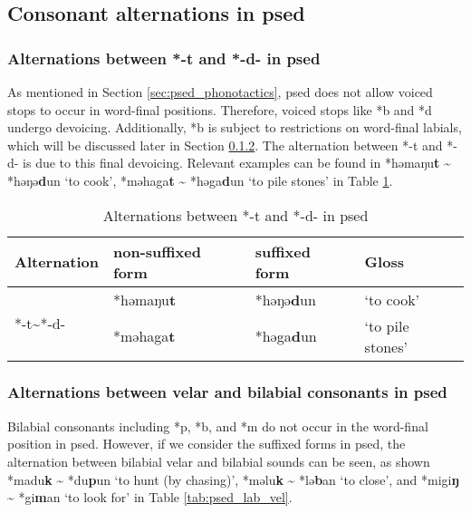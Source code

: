 \subsection{Consonant alternations in \acl{psed}}

\subsubsection{Alternations between *-t and *-d- in \acl{psed}}  \label{sec:psed_d2t}

As mentioned in Section \ref{sec:psed_phonotactics}, \acl{psed} does not allow voiced stops to occur in word-final positions. Therefore, voiced stops like *b and *d undergo devoicing. Additionally, *b is subject to restrictions on word-final labials, which will be discussed later in Section \ref{sed:psed_lab_vel}. The alternation between *-t and *-d- is due to this final devoicing. Relevant examples can be found in *həmaŋu\textbf{t} \~{} *həŋə\textbf{d}un `to cook', *məhaga\textbf{t} \~{} *həga\textbf{d}un `to pile stones' in Table \ref{tab:psed_d2t}.

\begin{table}[!htbp]
\centering
\caption{Alternations between *-t and *-d- in \acl{psed}}
\label{tab:psed_d2t}
\begin{tabular}{llll}
\hline
Alternation                   & non-suffixed form    & suffixed form & Gloss     \\ \hline
\multirow{2}{*}{*-t\~{ }*-d-} & *həmaŋu\textbf{t} & *həŋə\textbf{d}un     & `to cook' \\
                              & *məhaga\textbf{t} & *həga\textbf{d}un     & `to pile stones'   \\ \hline
\end{tabular}
\end{table}

\subsubsection{Alternations between velar and bilabial consonants in \acl{psed}} \label{sed:psed_lab_vel}

Bilabial consonants including *p, *b, and *m do not occur in the word-final position in \acl{psed}. However, if we consider the suffixed forms in \acl{psed}, the alternation between bilabial velar and bilabial sounds can be seen, as shown *madu\textbf{k} \~{} *du\textbf{p}un `to hunt (by chasing)', *məlu\textbf{k} \~{} *lə\textbf{b}an `to close', and *migi\textbf{ŋ} \~{} *gi\textbf{m}an  `to look for' in Table \ref{tab:psed_lab_vel}.

